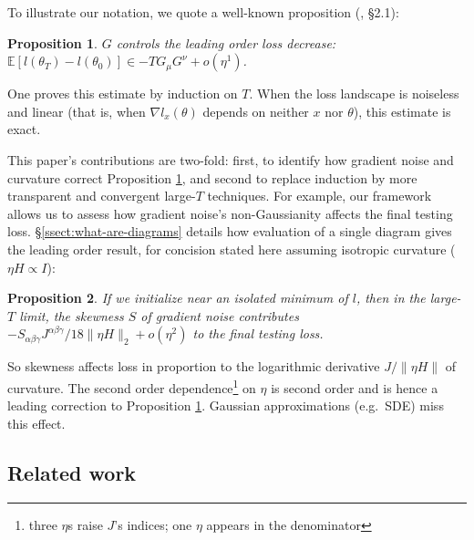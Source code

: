 \documentclass[final,12pt]{colt2021} %
\newtheorem{prop}{Proposition}
\newcommand{\expc}{\mathbb{E}}
\begin{document}

            To illustrate our notation, we quote a well-known proposition
            (\cite{ne04}, \S 2.1):
            \begin{prop}\label{prop:nest}
                $G$ controls the leading order loss decrease:
                $
                    \expc[l(\theta_T) - l(\theta_0)] \in
                    - 
                    T G_\mu G^\nu
                    + o(\eta^1)
                $.
            \end{prop}
            One proves this estimate by induction on $T$.  When the loss
            landscape is noiseless and linear (that is, when $\nabla
            l_x(\theta)$ depends on neither $x$ nor $\theta$), this estimate is
            exact.

            This paper's contributions are two-fold: first, to identify how
            gradient noise and curvature correct Proposition \ref{prop:nest},
            and second to replace induction by more transparent and convergent
            large-$T$ techniques.
            For example, our framework allows us to assess how gradient noise's
            non-Gaussianity affects the final testing loss.
            \S\ref{ssect:what-are-diagrams} details how evaluation of a single
            diagram gives the leading order result, for concision stated here
            assuming isotropic curvature ($\eta H \propto I$): 
            \begin{prop}
                If we initialize near an isolated minimum of $l$, then in the
                large-$T$ limit, the skewness $S$ of gradient noise
                contributes 
                $
                    - S_{\alpha\beta\gamma}
                    J^{\alpha\beta\gamma} / 18 \|\eta H\|_2 + o(\eta^2)
                $
                to the final testing loss.  
            \end{prop}
            So skewness affects loss in proportion to the logarithmic
            derivative $J/\|\eta H\|$ of curvature.  The second order dependence\footnote{
                three $\eta$s raise $J$'s indices; one $\eta$ appears in the
                denominator
            } on $\eta$ is second order and is hence a leading correction
            to Proposition \ref{prop:nest}.  Gaussian approximations (e.g.\
            SDE) miss this effect. 

        \newpage
        \subsection{Related work}
    
\end{document}
